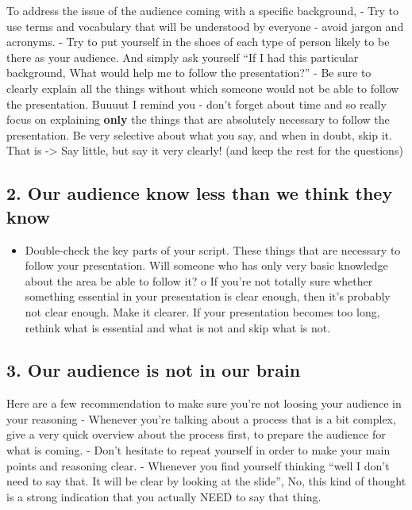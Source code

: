 \documentclass[
]{book}
\providecommand{\tightlist}{%
  \setlength{\itemsep}{0pt}\setlength{\parskip}{0pt}}
\begin{document}
To address the issue of the audience coming with a specific background,
- Try to use terms and vocabulary that will be understood by everyone - avoid jargon and acronyms.
- Try to put yourself in the shoes of each type of person likely to be there as your audience. And simply ask yourself ``If I had this particular background, What would help me to follow the presentation?''
- Be sure to clearly explain all the things without which someone would not be able to follow the presentation. Buuuut I remind you - don't forget about time and so really focus on explaining \textbf{only} the things that are absolutely necessary to follow the presentation. Be very selective about what you say, and when in doubt, skip it.
That is -\textgreater{} Say little, but say it very clearly! (and keep the rest for the questions)

\hypertarget{our-audience-know-less-than-we-think-they-know}{%
\subsection{2. Our audience know less than we think they know}\label{our-audience-know-less-than-we-think-they-know}}

\begin{itemize}
\tightlist
\item
  Double-check the key parts of your script. These things that are necessary to follow your presentation. Will someone who has only very basic knowledge about the area be able to follow it?
  o If you're not totally sure whether something essential in your presentation is clear enough, then it's probably not clear enough. Make it clearer. If your presentation becomes too long, rethink what is essential and what is not and skip what is not.
\end{itemize}

\hypertarget{our-audience-is-not-in-our-brain}{%
\subsection{3. Our audience is not in our brain}\label{our-audience-is-not-in-our-brain}}

Here are a few recommendation to make sure you're not loosing your audience in your reasoning
- Whenever you're talking about a process that is a bit complex, give a very quick overview about the process first, to prepare the audience for what is coming.
- Don't hesitate to repeat yourself in order to make your main points and reasoning clear.
- Whenever you find yourself thinking ``well I don't need to say that. It will be clear by looking at the slide'', No, this kind of thought is a strong indication that you actually NEED to say that thing.
\end{document}
